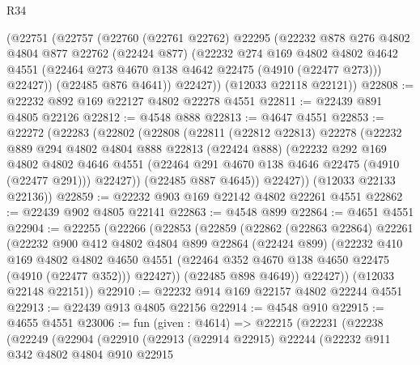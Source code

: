 \begin{lexlean}{R34}
\begin{coremodule}
      (@22751
        (@22757
          (@22760
            (@22761 @22762)
            @22295
            (@22232
              @878
              @276
              @4802
              @4804
              @877
              @22762
              (@22424 @877)
              (@22232
                @274
                @169
                @4802
                @4802
                @4642
                @4551
                (@22464 @273 @4670 @138 @4642 @22475 (@4910 (@22477 @273)))
                @22427))
            (@22485 @876 @4641))
          @22427))
      (@12033 @22118 @22121))
@22808 := @22232 @892 @169 @22127 @4802 @22278 @4551
@22811 := @22439 @891 @4805 @22126
@22812 := @4548 @888
@22813 := @4647 @4551
@22853 := @22272
    (@22283
      (@22802
        (@22808
          (@22811
            (@22812 @22813)
            @22278
            (@22232
              @889
              @294
              @4802
              @4804
              @888
              @22813
              (@22424 @888)
              (@22232
                @292
                @169
                @4802
                @4802
                @4646
                @4551
                (@22464 @291 @4670 @138 @4646 @22475 (@4910 (@22477 @291)))
                @22427))
            (@22485 @887 @4645))
          @22427))
      (@12033 @22133 @22136))
@22859 := @22232 @903 @169 @22142 @4802 @22261 @4551
@22862 := @22439 @902 @4805 @22141
@22863 := @4548 @899
@22864 := @4651 @4551
@22904 := @22255
    (@22266
      (@22853
        (@22859
          (@22862
            (@22863 @22864)
            @22261
            (@22232
              @900
              @412
              @4802
              @4804
              @899
              @22864
              (@22424 @899)
              (@22232
                @410
                @169
                @4802
                @4802
                @4650
                @4551
                (@22464 @352 @4670 @138 @4650 @22475 (@4910 (@22477 @352)))
                @22427))
            (@22485 @898 @4649))
          @22427))
      (@12033 @22148 @22151))
@22910 := @22232 @914 @169 @22157 @4802 @22244 @4551
@22913 := @22439 @913 @4805 @22156
@22914 := @4548 @910
@22915 := @4655 @4551
@23006 := fun (given : @4614) =>
  @22215
    (@22231
      (@22238
        (@22249
          (@22904
            (@22910
              (@22913
                (@22914 @22915)
                @22244
                (@22232
                  @911
                  @342
                  @4802
                  @4804
                  @910
                  @22915

\end{coremodule}
\end{lexlean}

